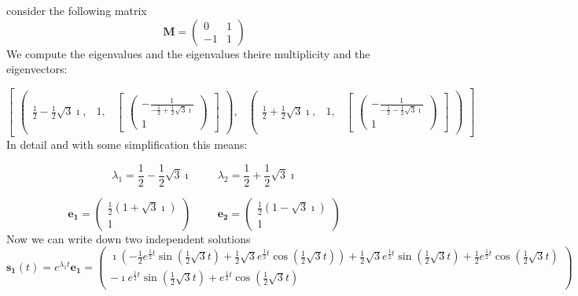 \documentclass[10pt,a4paper]{article}
\begin{document}
      consider the following matrix 
      \[
 \mathbf{M}=      \left(\begin{matrix}0 & 1\\-1 & 1\end{matrix}\right)      \]We compute the eigenvalues and the eigenvalues theire multiplicity and the eigenvectors:

\[
\begin{bmatrix}\begin{pmatrix}\frac{1}{2} - \frac{1}{2} \sqrt{3} \mathbf{\imath}, & 1, & \begin{bmatrix}\left(\begin{matrix}- \frac{1}{- \frac{1}{2} + \frac{1}{2} \sqrt{3} \mathbf{\imath}}\\1\end{matrix}\right)\end{bmatrix}\end{pmatrix}, & \begin{pmatrix}\frac{1}{2} + \frac{1}{2} \sqrt{3} \mathbf{\imath}, & 1, & \begin{bmatrix}\left(\begin{matrix}- \frac{1}{- \frac{1}{2} - \frac{1}{2} \sqrt{3} \mathbf{\imath}}\\1\end{matrix}\right)\end{bmatrix}\end{pmatrix}\end{bmatrix}
\]
In detail and with some simplification this means:

\[
\lambda_1=\frac{1}{2} - \frac{1}{2} \sqrt{3} \mathbf{\imath} \hspace{1cm} \lambda_2=\frac{1}{2} + \frac{1}{2} \sqrt{3} \mathbf{\imath}
\]

\[
\mathbf{e_1}=\left(\begin{matrix}\frac{1}{2} \left(1 + \sqrt{3} \mathbf{\imath}\right)\\1\end{matrix}\right) \hspace{1cm} \mathbf{e_2}=\left(\begin{matrix}\frac{1}{2} \left(1 - \sqrt{3} \mathbf{\imath}\right)\\1\end{matrix}\right)
\]
Now we can write down two independent solutions
\[
\mathbf{s_1}(t)=e^{\lambda_1 t}\mathbf{e_1}=\left(\begin{matrix}\mathbf{\imath} \left(- \frac{1}{2} e^{\frac{1}{2} t} \sin{\left (\frac{1}{2} \sqrt{3} t \right )} + \frac{1}{2} \sqrt{3} e^{\frac{1}{2} t} \cos{\left (\frac{1}{2} \sqrt{3} t \right )}\right) + \frac{1}{2} \sqrt{3} e^{\frac{1}{2} t} \sin{\left (\frac{1}{2} \sqrt{3} t \right )} + \frac{1}{2} e^{\frac{1}{2} t} \cos{\left (\frac{1}{2} \sqrt{3} t \right )}\\- \mathbf{\imath} e^{\frac{1}{2} t} \sin{\left (\frac{1}{2} \sqrt{3} t \right )} + e^{\frac{1}{2} t} \cos{\left (\frac{1}{2} \sqrt{3} t \right )}\end{matrix}\right)
\]
\end{document}
